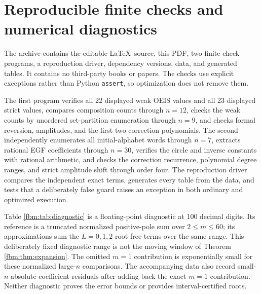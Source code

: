 \documentclass[11pt]{article}
\theoremstyle{remark}\newtheorem{remark}[theorem]{Remark}
\begin{document}
\section{Reproducible finite checks and numerical diagnostics}\label{fbm:sec:checks}
The archive contains the editable \LaTeX\ source, this PDF, two finite-check programs, a reproduction driver, dependency versions, data, and generated tables. It contains no third-party books or papers. The checks use explicit exceptions rather than Python \texttt{assert}, so optimization does not remove them.

The first program verifies all 22 displayed weak OEIS values and all 23 displayed strict values, compares composition counts through $n=12$, checks the weak counts by unordered set-partition enumeration through $n=9$, and checks formal reversion, amplitudes, and the first two correction polynomials. The second independently enumerates all initial-alphabet words through $n=7$, extracts rational EGF coefficients through $n=30$, verifies the circle and inverse constants with rational arithmetic, and checks the correction recurrence, polynomial degree ranges, and strict amplitude shift through order four. The reproduction driver compares the independent exact terms, generates every table from the data, and tests that a deliberately false guard raises an exception in both ordinary and optimized execution.

Table \ref{fbm:tab:diagnostic} is a floating-point diagnostic at 100 decimal digits. Its reference is a truncated normalized positive-pole sum over $2\leq m\leq60$; its approximations sum the $L=0,1,2$ root-free terms over the same range. This deliberately fixed diagnostic range is not the moving window of Theorem \ref{fbm:thm:expansion}. The omitted $m=1$ contribution is exponentially small for these normalized large-$n$ comparisons. The accompanying data also record small-$n$ absolute coefficient residuals after adding back the exact $m=1$ contribution. Neither diagnostic proves the error bounds or provides interval-certified roots.
\end{document}
